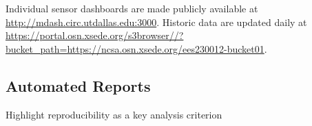 Individual sensor dashboards are made publicly available at \url{http://mdash.circ.utdallas.edu:3000}. Historic data are updated daily at \url{https://portal.osn.xsede.org/s3browser//?bucket_path=https://ncsa.osn.xsede.org/ees230012-bucket01}.





\subsection{Automated Reports}

Highlight reproducibility as a key analysis criterion







